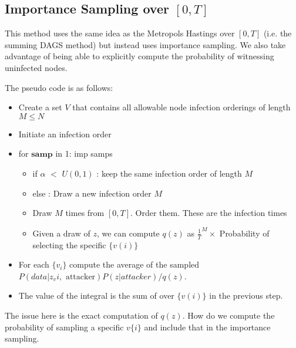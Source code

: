 \documentclass{article}
\begin{document}
\subsection{Importance Sampling over $[0, T]$ }
This method uses the same idea as the Metropols Hastings over $[0, T]$ (i.e. the summing DAGS method) but instead uses importance sampling.  We also take advantage of being able to explicitly compute the probability of witnessing uninfected nodes.   

The pseudo code is as follows:

\begin{itemize}
\item Create a set $V$ that contains all allowable node infection orderings of 
length $M \le N$
\item Initiate an infection order
\item for $\mathbf{samp}$ in 1: imp samps
\begin{itemize}
\item if $\alpha$ $<$ $U(0,1)$ : keep the same infection order of length $M$
\item else : Draw a new infection order $M$
\item Draw $M$ times from $[0,T]$.  Order them.  These are the infection times
\item Given a draw of $z$, we can compute $q(z)$ as $\frac{1}{T}^M \times$ Probability of selecting the specific $\{v(i)\}$ 
\end{itemize}
\item For each $\{v_i\}$ compute the average of the sampled 
$P(data | z_v{i}, \text{ attacker})P(z | attacker)/q(z)$.
\item The value of the integral is the sum of over $\{v(i)\}$ in the previous step.
\end{itemize}
The issue here is the exact computation of $q(z)$.  How do we compute the probability
of sampling a specific $v\{i\}$ and include that in the importance sampling.  
\end{document}
